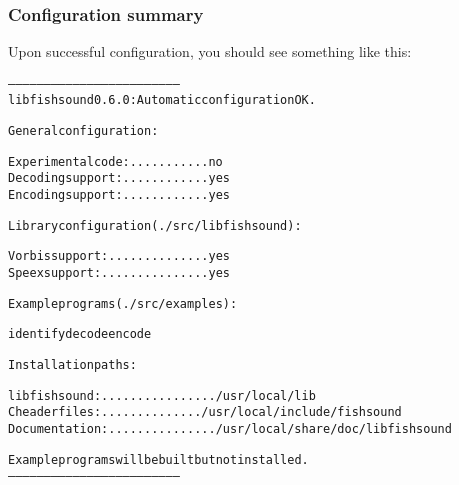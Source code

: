 \subsubsection{Configuration summary}\label{summary}
Upon successful configuration, you should see something like this: \small\begin{alltt}
------------------------------------------------------------------------
  libfishsound 0.6.0:  Automatic configuration OK.\end{alltt}\normalsize 


\small\begin{alltt}  General configuration:\end{alltt}\normalsize 


\small\begin{alltt}    Experimental code: ........... no
    Decoding support: ............ yes
    Encoding support: ............ yes\end{alltt}\normalsize 


\small\begin{alltt}  Library configuration (./src/libfishsound):\end{alltt}\normalsize 


\small\begin{alltt}    Vorbis support: .............. yes
    Speex support: ............... yes\end{alltt}\normalsize 


\small\begin{alltt}  Example programs (./src/examples):\end{alltt}\normalsize 


\small\begin{alltt}    identify decode encode\end{alltt}\normalsize 


\small\begin{alltt}  Installation paths:\end{alltt}\normalsize 


\small\begin{alltt}    libfishsound: ................ /usr/local/lib
    C header files: .............. /usr/local/include/fishsound
    Documentation: ............... /usr/local/share/doc/libfishsound\end{alltt}\normalsize 


\small\begin{alltt}  Example programs will be built but not installed.
------------------------------------------------------------------------
\end{alltt}\normalsize 
 